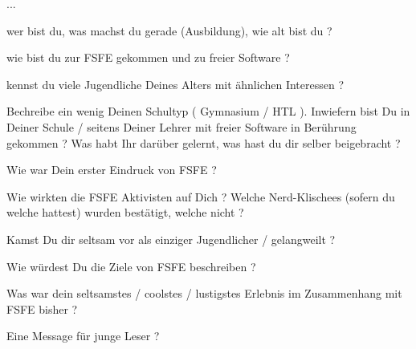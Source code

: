 ...

wer bist du, was machst du gerade (Ausbildung), wie alt bist du ?




wie bist du zur FSFE gekommen und zu freier Software ?



kennst du viele Jugendliche Deines Alters mit ähnlichen Interessen ?



Bechreibe ein wenig Deinen Schultyp ( Gymnasium / HTL ). Inwiefern bist Du in Deiner Schule / seitens Deiner Lehrer 
mit freier Software in Berührung gekommen ? Was habt Ihr darüber gelernt, was hast du dir selber beigebracht ?





Wie war Dein erster Eindruck von FSFE ?


Wie wirkten die FSFE Aktivisten auf Dich ? Welche Nerd-Klischees (sofern du welche hattest) wurden bestätigt, 
welche nicht ?



Kamst Du dir seltsam vor als einziger Jugendlicher / gelangweilt ?


Wie würdest Du die Ziele von FSFE beschreiben ?


Was war dein seltsamstes / coolstes / lustigstes Erlebnis im Zusammenhang mit FSFE bisher ?


Eine Message für junge Leser ?



